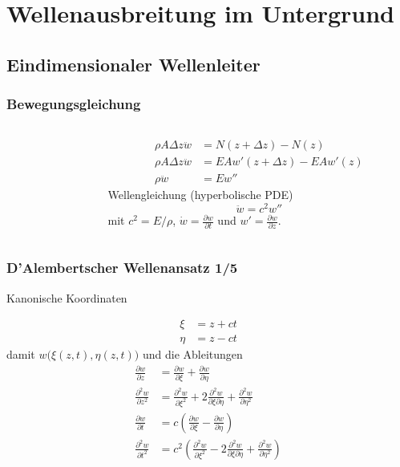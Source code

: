 \documentclass[hyperref={pdfpagemode=FullScreen, colorlinks=false}]{beamer}
\begin{document}
\maketitle


\section{Wellenausbreitung im Untergrund}

\subsection{Eindimensionaler Wellenleiter}

\begin{frame}
 \frametitle{Bewegungsgleichung}
 \begin{columns}
        \begin{column}[t]{.5\linewidth}
 
 \end{column}
        \begin{column}[t]{.5\linewidth}
        \vspace{-5cm}
        \begin{align*}
         \rho A \Delta z \ddot{w}&=N(z+\Delta z) - N(z)  \\
         \rho A \Delta z \ddot{w}&=EAw'(z+\Delta z) - EAw'(z)  \\
         \rho \ddot{w}&=Ew''  
        \end{align*}
        Wellengleichung (hyperbolische PDE)
        \begin{equation*}
         \ddot{w}=c^2 w''
        \end{equation*}
        mit $c^2=E/\rho$, $\dot{w}=\frac{\partial w}{\partial t}$ und $w'=\frac{\partial w}{\partial z}$.
        \end{column}
        
 \end{columns}
\end{frame}


\begin{frame}
\frametitle{D'Alembertscher Wellenansatz 1/5}
Kanonische Koordinaten 
\hfill 

\begin{align*}
 \xi &= z+ct \\
 \eta &= z-ct 
\end{align*}
damit $w\bigl( \xi(z,t), \eta(z,t) \bigr)$ und die Ableitungen
\begin{align*}
\frac{\partial w}{\partial z} &= \frac{\partial w}{\partial \xi} + \frac{\partial w}{\partial \eta} \\
\frac{\partial^2 w}{\partial z^2} &= \frac{\partial^2 w}{\partial \xi^2} +
2\frac{\partial^2 w}{\partial \xi \partial \eta} + \frac{\partial^2 w}{\partial \eta^2} \\
\frac{\partial w}{\partial t} &=c\left( \frac{\partial w}{\partial \xi} - \frac{\partial w}{\partial \eta}\right) \\
\frac{\partial^2 w}{\partial t^2} &= c^2\left( \frac{\partial^2 w}{\partial \xi^2} -2\frac{\partial^2 w}{\partial \xi \partial \eta} + \frac{\partial^2 w}{\partial \eta^2}\right)
\end{align*}
\end{frame}
\end{document}

